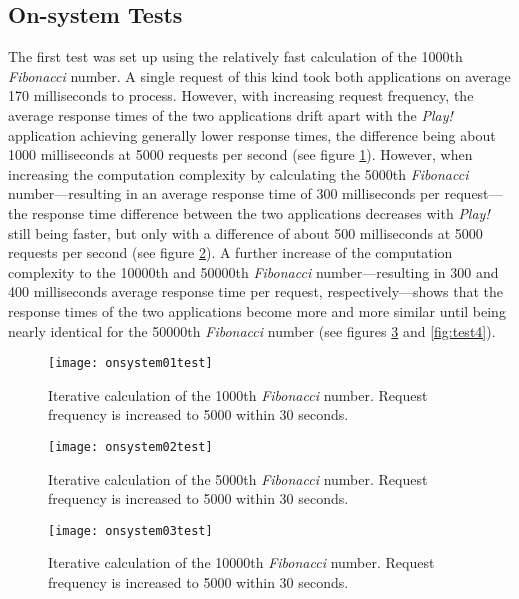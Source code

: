 \subsection*{On-system Tests}
The first test was set up using the relatively fast calculation of the 1000th \textit{Fibonacci} number. A single request of this kind took both applications on average 170 milliseconds to process. However, with increasing request frequency, the average response times of the two applications drift apart with the \textit{Play!} application achieving generally lower response times, the difference being about 1000 milliseconds at 5000 requests per second (see figure \ref{fig:test1}). However, when increasing the computation complexity by calculating the 5000th \textit{Fibonacci} number---resulting in an average response time of 300 milliseconds per request---the response time difference between the two applications decreases with \textit{Play!} still being faster, but only with a difference of about 500 milliseconds at 5000 requests per second (see figure \ref{fig:test2}). A further increase of the computation complexity to the 10000th and 50000th \textit{Fibonacci} number---resulting in 300 and 400 milliseconds average response time per request, respectively---shows that the response times of the two applications become more and more similar until being nearly identical for the 50000th \textit{Fibonacci} number (see figures \ref{fig:test3} and \ref{fig:test4}).

\begin{figure}
\centering\small
\setlength{\tabcolsep}{0mm}
  \texttt{[image: onsystem01test]}
\caption{Iterative calculation of the 1000th \textit{Fibonacci} number. Request frequency is increased to 5000 within 30 seconds.
}
\label{fig:test1} 
\end{figure}

\begin{figure}
\centering\small
\setlength{\tabcolsep}{0mm}
  \texttt{[image: onsystem02test]} 
\caption{Iterative calculation of the 5000th \textit{Fibonacci} number. Request frequency is increased to 5000 within 30 seconds.
}
\label{fig:test2} 
\end{figure}

\begin{figure}
\centering\small
\setlength{\tabcolsep}{0mm}
  \texttt{[image: onsystem03test]}
\caption{Iterative calculation of the 10000th \textit{Fibonacci} number. Request frequency is increased to 5000 within 30 seconds.
}
\label{fig:test3} 
\end{figure}

